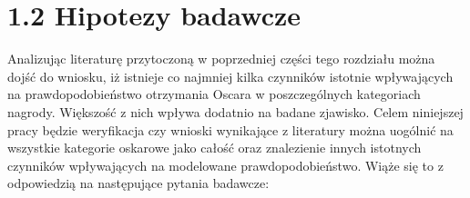 \section*{1.2 Hipotezy badawcze}

Analizując literaturę przytoczoną w poprzedniej części tego rozdziału można dojść do wniosku, iż istnieje co najmniej kilka czynników istotnie wpływających na prawdopodobieństwo otrzymania Oscara w poszczególnych kategoriach nagrody. Większość z nich wpływa dodatnio na badane zjawisko. Celem niniejszej pracy będzie weryfikacja czy wnioski wynikające z literatury można uogólnić na wszystkie kategorie oskarowe jako całość oraz znalezienie innych istotnych czynników wpływających na modelowane prawdopodobieństwo. Wiąże się to z odpowiedzią na następujące pytania badawcze:

